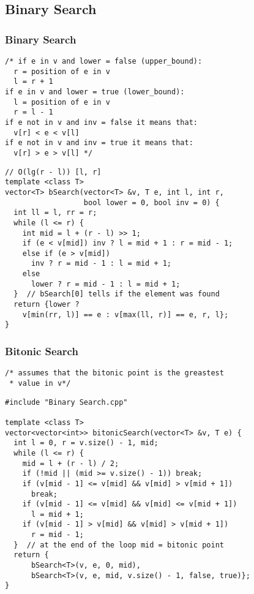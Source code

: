\documentclass[twoside]{article}
\begin{document}
\begin{multicols*}{2}
\subsection*{Binary Search}
\vspace{2em}
\subsubsectionfont{\large\bfseries\sffamily\underline}
\subsubsection*{Binary Search}
\begin{verbatim}
/* if e in v and lower = false (upper_bound):
  r = position of e in v
  l = r + 1
if e in v and lower = true (lower_bound):
  l = position of e in v
  r = l - 1
if e not in v and inv = false it means that:
  v[r] < e < v[l]
if e not in v and inv = true it means that:
  v[r] > e > v[l] */
\end{verbatim}
\vspace{-12pt}
\begin{verbatim}
// O(lg(r - l)) [l, r]
template <class T>
vector<T> bSearch(vector<T> &v, T e, int l, int r,
                  bool lower = 0, bool inv = 0) {
  int ll = l, rr = r;
  while (l <= r) {
    int mid = l + (r - l) >> 1;
    if (e < v[mid]) inv ? l = mid + 1 : r = mid - 1;
    else if (e > v[mid])
      inv ? r = mid - 1 : l = mid + 1;
    else
      lower ? r = mid - 1 : l = mid + 1;
  }  // bSearch[0] tells if the element was found
  return {lower ?
    v[min(rr, l)] == e : v[max(ll, r)] == e, r, l};
}
\end{verbatim}

\subsubsectionfont{\large\bfseries\sffamily\underline}
\subsubsection*{Bitonic Search}
\begin{verbatim}
/* assumes that the bitonic point is the greastest
 * value in v*/

\end{verbatim}
\vspace{-12pt}
\begin{verbatim}
#include "Binary Search.cpp"

template <class T>
vector<vector<int>> bitonicSearch(vector<T> &v, T e) {
  int l = 0, r = v.size() - 1, mid;
  while (l <= r) {
    mid = l + (r - l) / 2;
    if (!mid || (mid >= v.size() - 1)) break;
    if (v[mid - 1] <= v[mid] && v[mid] > v[mid + 1])
      break;
    if (v[mid - 1] <= v[mid] && v[mid] <= v[mid + 1])
      l = mid + 1;
    if (v[mid - 1] > v[mid] && v[mid] > v[mid + 1])
      r = mid - 1;
  }  // at the end of the loop mid = bitonic point
  return {
      bSearch<T>(v, e, 0, mid),
      bSearch<T>(v, e, mid, v.size() - 1, false, true)};
}
\end{verbatim}


\end{multicols*}
\end{document}
